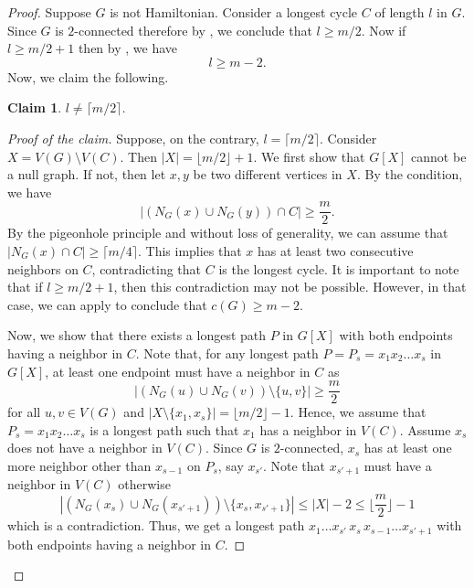 \documentclass[12pt]{article}
\newtheorem{claim}{Claim}
\theoremstyle{definition}
\begin{document}
\begin{proof}
 Suppose $G$ is not Hamiltonian. Consider a longest cycle $C$ of length $l$ in $G$. Since $G$ is $2$-connected therefore by , we conclude that $l\geq m/2$. Now if $l\geq m/2+1$ then by , we have
\begin{equation}\label{eqn:lemmafirsteqon_l}
    l\geq m-2.
\end{equation}
Now, we claim the following. 
\begin{claim}
    $l\neq \lceil m/2\rceil$.
\end{claim}
\begin{proof}[Proof of the claim]
    Suppose, on the contrary, $l=\lceil{m}/{2}\rceil$. Consider $X=V(G)\setminus V(C)$. Then $|X|=\lfloor{m}/{2}\rfloor+1$. We first show that $G[X]$ cannot be a null graph. If not, then let $x,y$ be two different vertices in $X$. By the condition, we have 
    $$ |(N_{G}(x)\cup N_{G}(y))\cap C|\geq \frac{m}{2}.$$ 
    By the pigeonhole principle and without loss of generality, we can assume that $|N_G(x)\cap C|\geq \lceil{m}/{4}\rceil$. This implies that $x$ has at least two consecutive neighbors on $C$, contradicting that $C$ is the longest cycle. It is important to note that if $l\geq m/2+1$, then this contradiction may not be possible. However, in that case, we can apply  to conclude that $c(G)\geq m-2$. 
    
    
    
    Now, we show that there exists a longest path $P$ in $G[X]$ with both endpoints having a neighbor in $C$. Note that, for any longest path $P=P_{s}=x_{1}x_{2}\ldots x_{s}$ in $G[X]$, at least one endpoint must have a neighbor in $C$ as 
    \begin{equation*}
        |(N_{G}(u)\cup N_{G}(v))\setminus\{u,v\}|\geq \frac{m}{2}
    \end{equation*}
    for all $u,v\in V(G)$ and $|X\setminus \{x_{1},x_{s}\}|=\lfloor{m}/{2}\rfloor-1$. Hence, we assume that $P_s=x_1 x_2\ldots x_s$ is a longest path such that $x_1$ has a neighbor in $V(C)$. Assume $x_s$ does not have a neighbor in $V(C)$. Since $G$ is $2$-connected, $x_s$ has at least  one more neighbor other than $x_{s-1}$ on $P_s$, say $x_{s'}$. Note that $x_{s'+1}$ must have a neighbor in $V(C)$ otherwise 
\begin{equation*}
    |(N_{G}(x_{s})\cup N_{G}(x_{s'+1}))\setminus\{x_{s},x_{s'+1}\}|\leq|X|-2\leq  \bigg\lfloor\frac{m}{2}\bigg\rfloor-1
\end{equation*}
which is a contradiction. Thus, we get a longest path $x_1\ldots x_{s'}\, x_s\, x_{s-1}\ldots x_{s'+1}$ with both endpoints having a neighbor in $C$.
 



\end{proof}
\end{proof}
\end{document}
